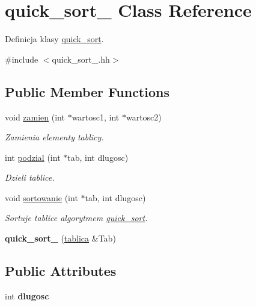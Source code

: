 \hypertarget{classquick__sort__2}{\section{quick\-\_\-sort\-\_ \-Class \-Reference}
\label{classquick__sort__2}
}


\-Definicja klasy \hyperlink{classquick__sort}{quick\-\_\-sort}.  




{\ttfamily \#include $<$quick\-\_\-sort\-\_.\-hh$>$}

\subsection*{\-Public \-Member \-Functions}
\begin{DoxyCompactItemize}
\item 
void \hyperlink{classquick__sort__2_ac472c5cdc21ae35bae3735decd8fcea0}{zamien} (int $\ast$wartosc1, int $\ast$wartosc2)
\begin{DoxyCompactList}\small\item\em \-Zamienia elementy tablicy. \end{DoxyCompactList}\item 
int \hyperlink{classquick__sort__2_a44d9f54ed16bcd3a08819e660a78edad}{podzial} (int $\ast$tab, int dlugosc)
\begin{DoxyCompactList}\small\item\em \-Dzieli tablice. \end{DoxyCompactList}\item 
void \hyperlink{classquick__sort__2_acfe8a308c6b761aacb40d3c717ee9291}{sortowanie} (int $\ast$tab, int dlugosc)
\begin{DoxyCompactList}\small\item\em \-Sortuje tablice algorytmem \hyperlink{classquick__sort}{quick\-\_\-sort}. \end{DoxyCompactList}\item 
\hypertarget{classquick__sort__2_a932722f90cd6d20e83ad57d76a4abef1}{{\bfseries quick\-\_\-sort\-\_} (\hyperlink{classtablica}{tablica} \&\-Tab)}\label{classquick__sort__2_a932722f90cd6d20e83ad57d76a4abef1}

\end{DoxyCompactItemize}
\subsection*{\-Public \-Attributes}
\begin{DoxyCompactItemize}
\item 
\hypertarget{classquick__sort__2_acb00b8af29ef28e2e24ac34c137f9f5a}{int {\bfseries dlugosc}}\label{classquick__sort__2_acb00b8af29ef28e2e24ac34c137f9f5a}

\end{DoxyCompactItemize}



